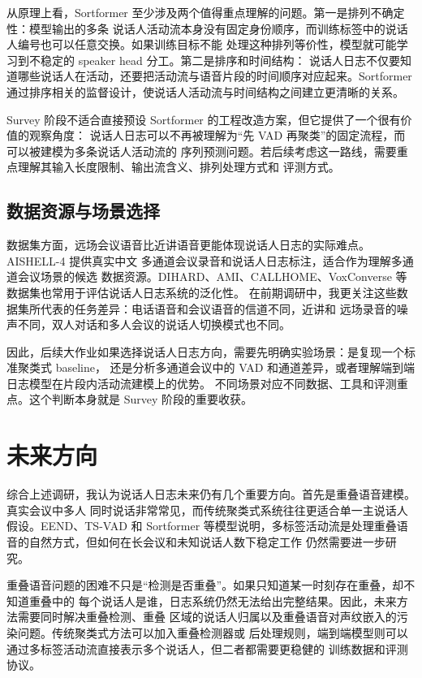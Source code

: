 \documentclass[UTF8,a4paper,10pt]{ctexart}
\begin{document}
从原理上看，Sortformer 至少涉及两个值得重点理解的问题。第一是排列不确定性：模型输出的多条
说话人活动流本身没有固定身份顺序，而训练标签中的说话人编号也可以任意交换。如果训练目标不能
处理这种排列等价性，模型就可能学习到不稳定的 speaker head 分工。第二是排序和时间结构：
说话人日志不仅要知道哪些说话人在活动，还要把活动流与语音片段的时间顺序对应起来。Sortformer
通过排序相关的监督设计，使说话人活动流与时间结构之间建立更清晰的关系。

Survey 阶段不适合直接预设 Sortformer 的工程改造方案，但它提供了一个很有价值的观察角度：
说话人日志可以不再被理解为“先 VAD 再聚类”的固定流程，而可以被建模为多条说话人活动流的
序列预测问题。若后续考虑这一路线，需要重点理解其输入长度限制、输出流含义、排列处理方式和
评测方式。

\subsection{数据资源与场景选择}

数据集方面，远场会议语音比近讲语音更能体现说话人日志的实际难点。AISHELL-4 提供真实中文
多通道会议录音和说话人日志标注\cite{fu2021aishell4}，适合作为理解多通道会议场景的候选
数据资源。DIHARD、AMI、CALLHOME、VoxConverse 等数据集也常用于评估说话人日志系统的泛化性。
在前期调研中，我更关注这些数据集所代表的任务差异：电话语音和会议语音的信道不同，近讲和
远场录音的噪声不同，双人对话和多人会议的说话人切换模式也不同。

因此，后续大作业如果选择说话人日志方向，需要先明确实验场景：是复现一个标准聚类式 baseline，
还是分析多通道会议中的 VAD 和通道差异，或者理解端到端日志模型在片段内活动流建模上的优势。
不同场景对应不同数据、工具和评测重点。这个判断本身就是 Survey 阶段的重要收获。

\section{未来方向}

综合上述调研，我认为说话人日志未来仍有几个重要方向。首先是重叠语音建模。真实会议中多人
同时说话非常常见，而传统聚类式系统往往更适合单一主说话人假设。EEND、TS-VAD 和 Sortformer
等模型说明，多标签活动流是处理重叠语音的自然方式，但如何在长会议和未知说话人数下稳定工作
仍然需要进一步研究。

重叠语音问题的困难不只是“检测是否重叠”。如果只知道某一时刻存在重叠，却不知道重叠中的
每个说话人是谁，日志系统仍然无法给出完整结果。因此，未来方法需要同时解决重叠检测、重叠
区域的说话人归属以及重叠语音对声纹嵌入的污染问题。传统聚类式方法可以加入重叠检测器或
后处理规则，端到端模型则可以通过多标签活动流直接表示多个说话人，但二者都需要更稳健的
训练数据和评测协议。
\end{document}
